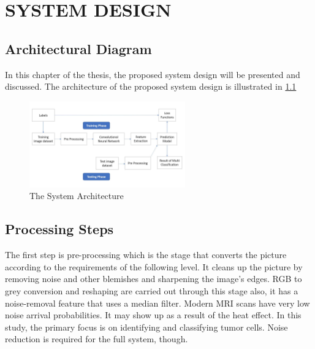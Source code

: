 \chapter{SYSTEM DESIGN}

\section{ Architectural Diagram }
In this chapter of the thesis, the proposed system design will be presented and discussed. The architecture of the proposed system design is illustrated in \ref{fig:sys_arch}

\begin{figure}
    \centering
    \includegraphics[width=0.60\textwidth]{Img/Chap-01/9.jpg}
    \caption{The System Architecture}
    \label{fig:sys_arch}
\end{figure}

\section{Processing Steps}

The first step is pre-processing which is the stage that converts the picture according to the requirements of the following level. It cleans up the picture by removing noise and other blemishes and sharpening the image's edges. RGB to grey conversion and reshaping are carried out through this stage also, it has a noise-removal feature that uses a median filter. Modern MRI scans have very low noise arrival probabilities. It may show up as a result of the heat effect. In this study, the primary focus is on identifying and classifying tumor cells. Noise reduction is required for the full system, though.


